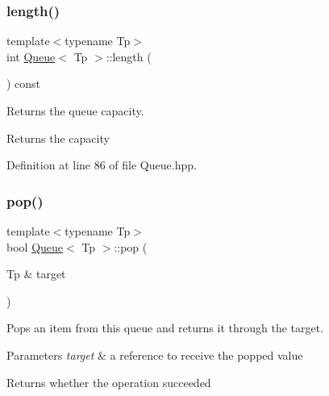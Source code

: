 \subsubsection{\texorpdfstring{length()}{length()}}
{\footnotesize\ttfamily template$<$typename Tp$>$ \\
int \mbox{\hyperlink{classQueue}{Queue}}$<$ Tp $>$\+::length (\begin{DoxyParamCaption}{ }\end{DoxyParamCaption}) const\hspace{0.3cm}{\ttfamily [inline]}}

Returns the queue capacity.

\begin{DoxyReturn}{Returns}
the capacity 
\end{DoxyReturn}


Definition at line 86 of file Queue.\+hpp.


\begin{DoxyCode}{0}

\end{DoxyCode}
\mbox{\label{classQueue_aac66ef3af1e47ec1ccd3dea60e40fd7c}} 
\subsubsection{\texorpdfstring{pop()}{pop()}}
{\footnotesize\ttfamily template$<$typename Tp$>$ \\
bool \mbox{\hyperlink{classQueue}{Queue}}$<$ Tp $>$\+::pop (\begin{DoxyParamCaption}\item[{Tp \&}]{target }\end{DoxyParamCaption})\hspace{0.3cm}{\ttfamily [inline]}}

Pops an item from this queue and returns it through the target.


\begin{DoxyParams}{Parameters}
{\em target} & a reference to receive the popped value \\
\hline
\end{DoxyParams}
\begin{DoxyReturn}{Returns}
whether the operation succeeded 
\end{DoxyReturn}


